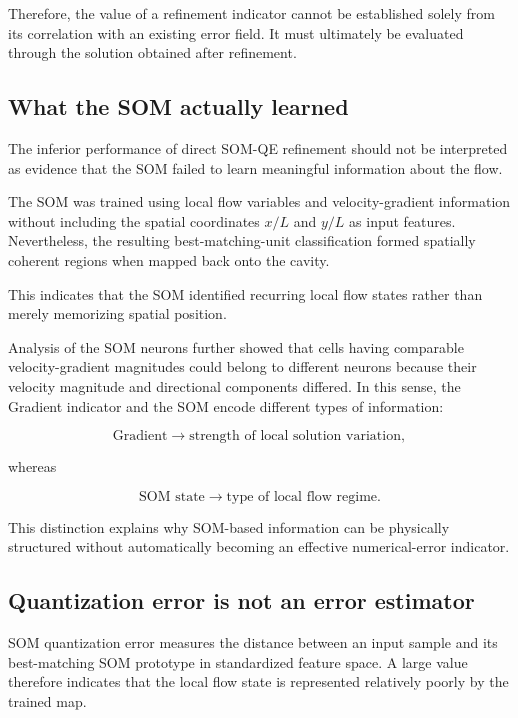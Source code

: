 Therefore, the value of a refinement indicator cannot be established solely
from its correlation with an existing error field. It must ultimately be
evaluated through the solution obtained after refinement.

\subsection{What the SOM actually learned}

The inferior performance of direct SOM-QE refinement should not be
interpreted as evidence that the SOM failed to learn meaningful information
about the flow.

The SOM was trained using local flow variables and velocity-gradient
information without including the spatial coordinates \(x/L\) and \(y/L\)
as input features. Nevertheless, the resulting best-matching-unit
classification formed spatially coherent regions when mapped back onto the
cavity.

This indicates that the SOM identified recurring local flow states rather
than merely memorizing spatial position.

Analysis of the SOM neurons further showed that cells having comparable
velocity-gradient magnitudes could belong to different neurons because their
velocity magnitude and directional components differed. In this sense, the
Gradient indicator and the SOM encode different types of information:

\begin{equation}
\text{Gradient}
\rightarrow
\text{strength of local solution variation},
\end{equation}

whereas

\begin{equation}
\text{SOM state}
\rightarrow
\text{type of local flow regime}.
\end{equation}

This distinction explains why SOM-based information can be physically
structured without automatically becoming an effective numerical-error
indicator.

\subsection{Quantization error is not an error estimator}

SOM quantization error measures the distance between an input sample and its
best-matching SOM prototype in standardized feature space. A large value
therefore indicates that the local flow state is represented relatively
poorly by the trained map.

